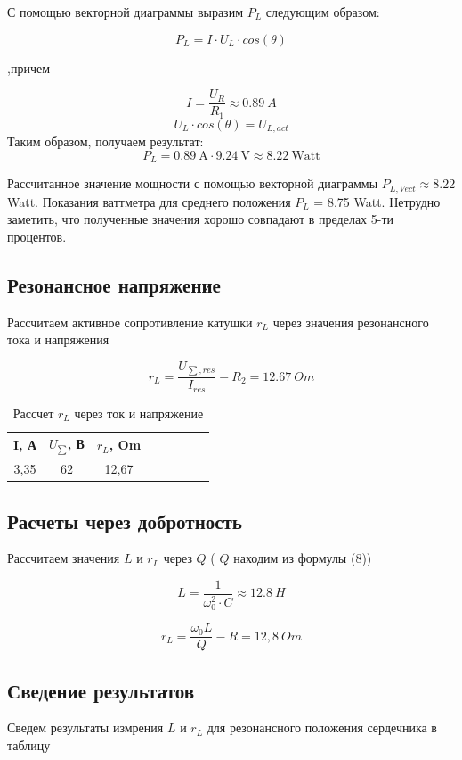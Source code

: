 \documentclass[a4paper,12pt]{article}
\begin{document}
С помощью векторной диаграммы выразим $P_L$ следующим образом:

$$
P_L = I\cdot U_L\cdot cos(\theta)
$$

,причем

$$
I = \frac{U_R}{R_1} \approx 0.89 \: A
$$
$$
U_L\cdot cos(\theta) = U_{L, act}
$$
Таким образом, получаем результат:
$$
P_{L} = 0.89 \: \text{A} \cdot 9.24 \: \text{V} \approx 8.22 \: \text{Watt}
$$

Рассчитанное значение мощности с помощью векторной диаграммы $P_{L,Vect} \approx 8.22$  Watt.
\newline
Показания ваттметра для среднего положения $P_{L}$ = 8.75 Watt. Нетрудно заметить, что полученные значения хорошо совпадают в пределах 5-ти процентов.

\subsection{Резонансное напряжение}
Рассчитаем активное сопротивление катушки $ r_{L}$ через значения резонансного тока и напряжения

$$
r_{L} = \frac{U_{\sum,res}}{I_{res}} - R_2 = 12.67 \: Om
$$


\begin{table}[h!]
	\centering
	\caption{Рассчет $ r_{L}$ через ток и напряжение }
	\begin{tabular}{|c|c|c|c|c|c|c|c|}
		\hline
		 I, А &  $U_{\sum}$, В & $ r_{L}$, Om \\
		\hline
		  3,35 & 62 &  12,67\\
		 \hline
	\end{tabular}%
\label{resT}%
\end{table}%


\subsection{Расчеты через добротность}
Рассчитаем значения $ L $ и $ r_{L} $ через $ Q $ ( $ Q $ находим из формулы (8))

$$
L = \frac{1}{\omega_{0}^2\cdot C} \approx  12.8 \: H
$$

$$
r_{L} = \frac{{\omega_{0}}{L}}{Q} - R = 12,8 \: Om
$$


\subsection{Сведение результатов}
Сведем результаты измрения $ L $ и $ r_{L} $ для резонансного положения сердечника в таблицу 
\end{document}
